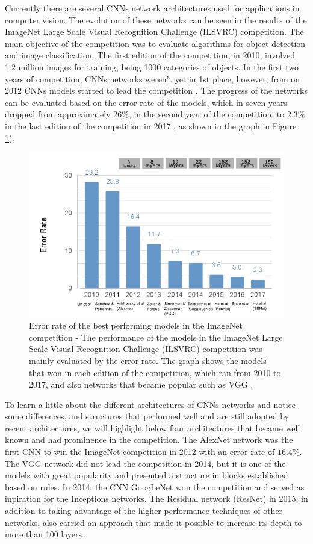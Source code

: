 Currently there are several CNNs network architectures used for applications in computer vision. The evolution of these networks can be seen in the results of the ImageNet Large Scale Visual Recognition Challenge (ILSVRC) competition. The main objective of the competition was to evaluate algorithms for object detection and image classification. The first edition of the competition, in 2010, involved 1.2 million images for training, being 1000 categories of objects. In the first two years of competition, CNNs networks weren't yet in 1st place, however, from on 2012 CNNs models started to lead the competition \cite{imagenet2020}. The progress of the networks can be evaluated based on the error rate of the models, which in seven years dropped from approximately $26\%$, in the second year of the competition, to $2.3\%$ in the last edition of the competition in 2017 \cite{johnson2019}, as shown in the graph in Figure \ref{fig:imagenet}).


\begin{figure}
    \centering
    \includegraphics[scale=0.4]{images/figure127.png}
    \caption{ Error rate of the best performing models in the ImageNet competition - The performance of the models in the ImageNet Large Scale Visual Recognition Challenge (ILSVRC) competition was mainly evaluated by the error rate. The graph shows the models that won in each edition of the competition, which ran from 2010 to 2017, and also networks that became popular such as VGG \cite{johnson2019}.}
    \label{fig:imagenet}
\end{figure}

To learn a little about the different architectures of CNNs networks and notice some differences, and structures that performed well and are still adopted by recent architectures, we will highlight below four architectures that became well known and had prominence in the competition. The AlexNet network was the first CNN to win the ImageNet competition in 2012 with an error rate of $16.4\%$. The VGG network did not lead the competition in 2014, but it is one of the models with great popularity and presented a structure in blocks established based on rules. In 2014, the CNN GoogLeNet won the competition and served as inpiration for the Inceptions networks. The Residual network (ResNet) in 2015, in addition to taking advantage of the higher performance techniques of other networks, also carried an approach that made it possible to increase its depth to more than 100 layers.

